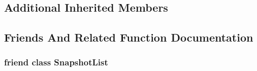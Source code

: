 \subsection*{Additional Inherited Members}


\subsection{Friends And Related Function Documentation}
\hypertarget{classleveldb_1_1_snapshot_impl_abe14b2fb5e32159324c619e1a42327a0}{
\subsubsection[{Snapshot\-List}]{\setlength{\rightskip}{0pt plus 5cm}friend class {\bf Snapshot\-List}\hspace{0.3cm}{\ttfamily [friend]}}}\label{classleveldb_1_1_snapshot_impl_abe14b2fb5e32159324c619e1a42327a0}


